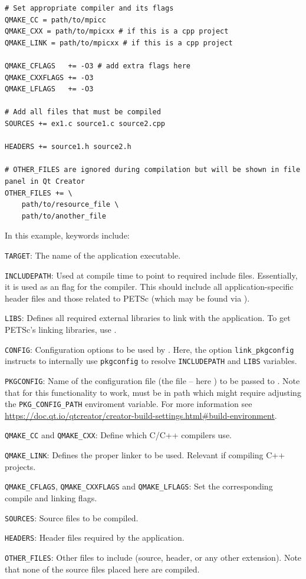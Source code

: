 {{{\begin{lstlisting}
# Set appropriate compiler and its flags
QMAKE_CC = path/to/mpicc
QMAKE_CXX = path/to/mpicxx # if this is a cpp project
QMAKE_LINK = path/to/mpicxx # if this is a cpp project

QMAKE_CFLAGS   += -O3 # add extra flags here
QMAKE_CXXFLAGS += -O3
QMAKE_LFLAGS   += -O3

# Add all files that must be compiled
SOURCES += ex1.c source1.c source2.cpp

HEADERS += source1.h source2.h

# OTHER_FILES are ignored during compilation but will be shown in file panel in Qt Creator
OTHER_FILES += \
	path/to/resource_file \
	path/to/another_file
\end{lstlisting}

In this example, keywords include:
\begin{tightitemize}
\item \lstinline{TARGET}: The name of the application executable.
\item \lstinline{INCLUDEPATH}: Used at compile time to point to required include files. Essentially, it is used as an  flag for the compiler. This should include all application-specific header files and those related to PETSc (which may be found via ).
\item \lstinline{LIBS}: Defines all required external libraries to link with the application. To get PETSc's linking libraries, use .
\item \lstinline{CONFIG}: Configuration options to be used by \trl{qmake}. Here, the option \lstinline{link_pkgconfig} instructs \trl{qmake} to internally
  use \lstinline{pkgconfig} to resolve \lstinline{INCLUDEPATH} and \lstinline{LIBS} variables.
\item \lstinline{PKGCONFIG}: Name of the configuration file (the \trl{.pc} file -- here ) to be passed to \trl{pkgconfig}. Note that for this functionality to work, \trl{petsc.pc} must be in path which might require adjusting the \lstinline{PKG_CONFIG_PATH} enviroment variable.
  For more information see \url{https://doc.qt.io/qtcreator/creator-build-settings.html#build-environment}.
\item \lstinline{QMAKE_CC} and \lstinline{QMAKE_CXX}: Define which C/C++ compilers use.
\item \lstinline{QMAKE_LINK}: Defines the proper linker to be used. Relevant if compiling C++ projects.
\item \lstinline{QMAKE_CFLAGS}, \lstinline{QMAKE_CXXFLAGS} and \lstinline{QMAKE_LFLAGS}: Set the corresponding compile and linking flags.
\item \lstinline{SOURCES}: Source files to be compiled.
\item \lstinline{HEADERS}: Header files required by the application.
\item \lstinline{OTHER_FILES}: Other files to include (source, header, or any other extension). Note that none of the source files placed here are compiled.
\end{tightitemize}

}}}

